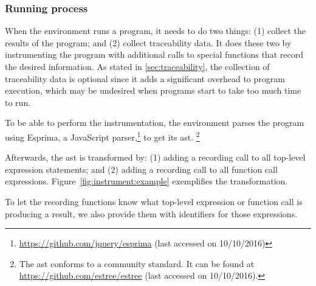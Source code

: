 %


\subsubsection{Running process}
When the environment runs a program, it needs to do two things: (1) collect the results of the program; and (2) collect traceability data.
It does these two by instrumenting the program with additional calls to special functions that record the desired information.
As stated in \ref{sec:traceability}, the collection of traceability data is optional since it adds a significant overhead to program execution, which may be undesired when programs start to take too much time to run.

To be able to perform the instrumentation, the environment parses the program using Esprima, a JavaScript parser,\footnote{\url{https://github.com/jquery/esprima} (last accessed on 10/10/2016)} to get its \gls{ast}.%
\footnote{The \gls{ast} conforms to a community standard. It can be found at \url{https://github.com/estree/estree} (last accessed on 10/10/2016).}

Afterwards, the \gls{ast} is transformed by: (1) adding a recording call to all top-level expression statements; and (2) adding a recording call to all function call expressions.
Figure~\ref{fig:instrument:example} exemplifies the transformation.

To let the recording functions know what top-level expression or function call is producing a result, we also provide them with identifiers for those expressions.

